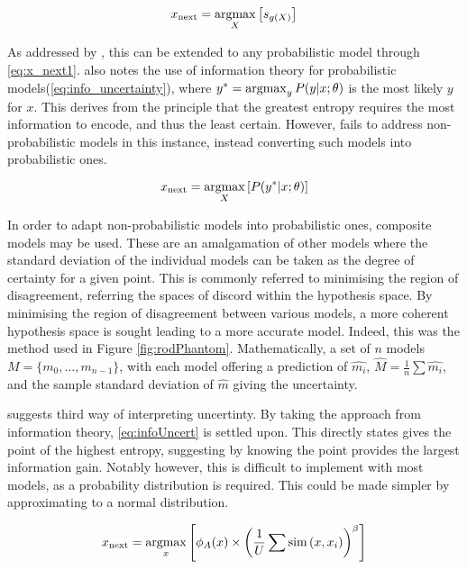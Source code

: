 \begin{equation}
  \label{eq:x_next1}
  x_\mathrm{next}=\operatorname*{argmax}_X{\left[s_{g(X)}\right]}
\end{equation}

As addressed by \textcite{Set09}, this can be extended to any probabilistic model through \ref{eq:x_next1}. \textcite{Set09} also notes the use of information theory for probabilistic models(\ref{eq:info_uncertainty}), where $y^{*}=\operatorname*{argmax}_y{}P(y|x;\theta{})$ is the most likely $y$ for $x$. This derives from the principle that the greatest entropy requires the most information to encode, and thus the least certain. However, \textcite{Set09} fails to address non-probabilistic models in this instance, instead converting such models into probabilistic ones.


\begin{equation}
  \label{eq:info_uncertainty}
  {x_\mathrm{next}=\operatorname*{argmax}_X{\left[P(y^{*}|x;\theta{})\right]}}
\end{equation}

In order to adapt non-probabilistic models into probabilistic ones, composite models may be used. These are an amalgamation of other models where the standard deviation of the individual models can be taken as the degree of certainty for a given point. This is commonly referred to minimising the region of disagreement, referring the spaces of discord within the hypothesis space. By minimising the region of disagreement between various models, a more coherent hypothesis space is sought leading to a more accurate model. Indeed, this was the method used in Figure \ref{fig:rodPhantom}. Mathematically, a set of $n$ models ${M = \{m_0,\ldots{}, m_{n-1}\}}$, with each model offering a prediction of $\hat{m_i}$, ${\hat{M}=\frac{1}{n}\sum{\hat{m_i}}}$, and the sample standard deviation of $\hat{m}$ giving the uncertainty.


\textcite{Set09} suggests  third way of interpreting uncertinty. By taking the approach from information theory, \ref{eq:infoUncert} is settled upon. This directly states gives the point of the highest entropy, suggesting by knowing the point provides the largest information gain. Notably however, this is difficult to implement with most models, as a probability distribution is required. This could be made simpler by approximating to a normal distribution.

\begin{equation}
  \label{eq:infoUncert}
  x_\mathrm{next}=\operatorname*{argmax}_x{\left[\phi_A(x)\times{\left(\frac{1}{U}\sum{\operatorname*{sim}{(x, x_i)}}\right)}^\beta\right]}
\end{equation}


